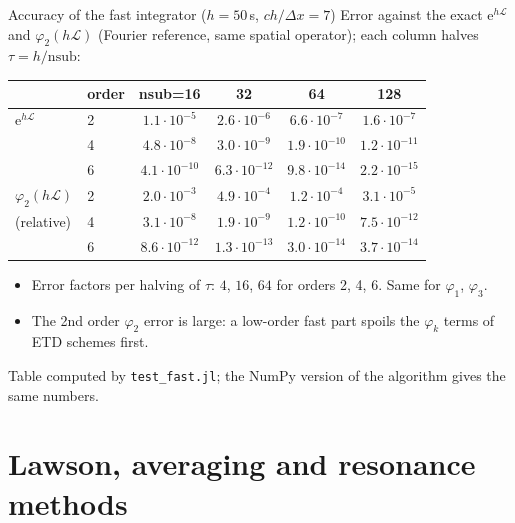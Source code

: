 \documentclass[aspectratio=169,10pt]{beamer}
\newcommand{\ee}{\mathrm{e}}
\newcommand{\LL}{\mathcal{L}}   %
\newcommand{\ph}{\varphi}
\begin{document}
\begin{frame}{Accuracy of the fast integrator ($h=50$\,s, $ch/\Delta x=7$)}
  Error against the exact $\ee^{h\LL}$ and $\ph_2(h\LL)$ (Fourier reference, same spatial operator); each column halves $\tau=h/\text{nsub}$:
  \medskip
  \begin{center}
  \small
  \begin{tabular}{llcccc}
    \toprule
     & order & nsub=16 & 32 & 64 & 128\\
    \midrule
    $\ee^{h\LL}$   & 2 & $1.1\cdot10^{-5}$ & $2.6\cdot10^{-6}$ & $6.6\cdot10^{-7}$ & $1.6\cdot10^{-7}$\\
                   & 4 & $4.8\cdot10^{-8}$ & $3.0\cdot10^{-9}$ & $1.9\cdot10^{-10}$ & $1.2\cdot10^{-11}$\\
                   & 6 & $4.1\cdot10^{-10}$ & $6.3\cdot10^{-12}$ & $9.8\cdot10^{-14}$ & $2.2\cdot10^{-15}$\\
    \midrule
    $\ph_2(h\LL)$  & 2 & $2.0\cdot10^{-3}$ & $4.9\cdot10^{-4}$ & $1.2\cdot10^{-4}$ & $3.1\cdot10^{-5}$\\
    (relative)     & 4 & $3.1\cdot10^{-8}$ & $1.9\cdot10^{-9}$ & $1.2\cdot10^{-10}$ & $7.5\cdot10^{-12}$\\
                   & 6 & $8.6\cdot10^{-12}$ & $1.3\cdot10^{-13}$ & $3.0\cdot10^{-14}$ & $3.7\cdot10^{-14}$\\
    \bottomrule
  \end{tabular}
  \end{center}
  \begin{itemize}
    \item Error factors per halving of $\tau$: $4$, $16$, $64$ for orders 2, 4, 6. Same for $\ph_1$, $\ph_3$.
    \item The 2nd order $\ph_2$ error is large: a low-order fast part spoils the $\ph_k$ terms of ETD schemes first.
  \end{itemize}
  {\scriptsize Table computed by \texttt{test\_fast.jl}; the NumPy version of the algorithm gives the same numbers.}
\end{frame}

\section{Lawson, averaging and resonance methods}
\end{document}
